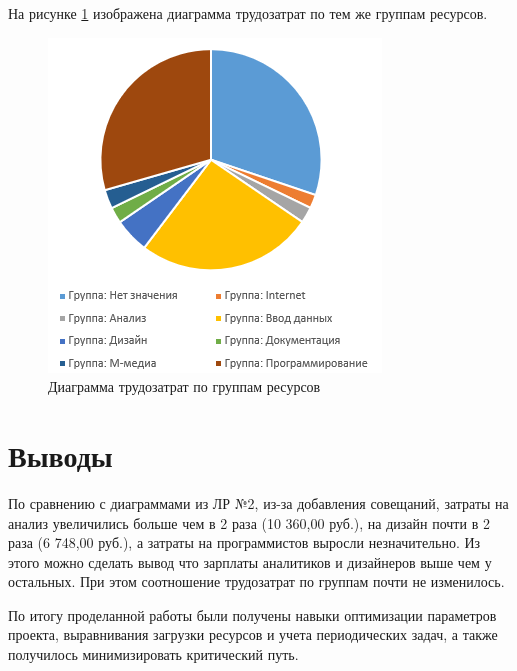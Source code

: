 На рисунке \ref{d2} изображена диаграмма трудозатрат по тем же группам ресурсов.
\begin{figure}[!h]
	\centering
	\includegraphics[width=0.6\linewidth]{inc/img/d2.png}
	\caption{Диаграмма трудозатрат по группам ресурсов}
	\label{d2}
\end{figure}

\section*{Выводы}
По сравнению с диаграммами из ЛР №2, из-за добавления совещаний, затраты на анализ увеличились больше чем в 2 раза (10 360,00 руб.), на дизайн почти в 2 раза (6 748,00 руб.), а затраты на программистов выросли незначительно. Из этого можно сделать вывод что зарплаты аналитиков и дизайнеров выше чем у остальных. При этом соотношение трудозатрат по группам почти не изменилось.

По итогу проделанной работы были получены навыки оптимизации параметров проекта, выравнивания загрузки ресурсов и учета периодических задач, а также получилось минимизировать критический путь.